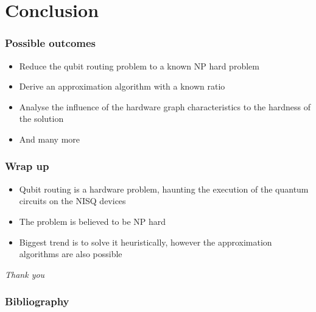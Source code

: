 \documentclass[lualatex,compress,12pt]{beamer}
\begin{document}
\section{Conclusion}


\begin{frame}
	\frametitle{Possible outcomes}
	
	
	\begin{itemize}
		
		\item Reduce the qubit routing problem to a known NP hard problem 
		\item Derive an approximation algorithm with a known ratio
		\item Analyse the influence of the hardware graph characteristics to the hardness of the solution
		\item And many more 
	\end{itemize}
	
\end{frame}	

\begin{frame}
	\frametitle{Wrap up}
	
	
	\begin{itemize}
		
		\item Qubit routing is a hardware problem, haunting the execution of the quantum circuits on the NISQ devices
		\item The problem is believed to be NP hard
		\item Biggest trend is to solve it heuristically, however the approximation algorithms are also possible
	\end{itemize}
	
\end{frame}	

\begin{frame}
  \centering \Large
	\emph{Thank you}

\end{frame}	

\begin{frame}[allowframebreaks]
	\frametitle{Bibliography}
	
	\printbibliography

\end{frame}
\end{document}
